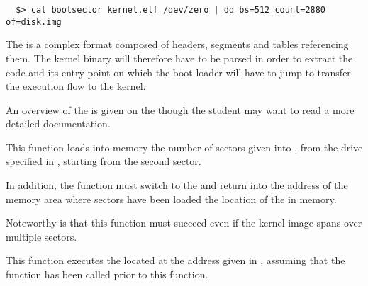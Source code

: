 \begin{verbatim}
  $> cat bootsector kernel.elf /dev/zero | dd bs=512 count=2880 of=disk.img
\end{verbatim}

The  is a complex format composed of headers, segments and tables
referencing them. The kernel binary will therefore have to be parsed in order
to extract the code and its entry point on which the boot loader will have
to jump to transfer the execution flow to the kernel.

An overview of the  is given on the  though the student
may want to read a more detailed documentation.

{
  This function loads into memory the number of sectors given into
  , from the drive specified in , starting from
  the second sector.

  \-

  In addition, the function must switch to the  and
  return into  the address of the memory area where sectors
  have been loaded \ie{} the location of the  in memory.

  \-

  Noteworthy is that this function must succeed even if the kernel image
  spans over multiple sectors.
}

{
  This function executes the  located at the address given in
  , assuming that the  function has
  been called prior to this function.
}
